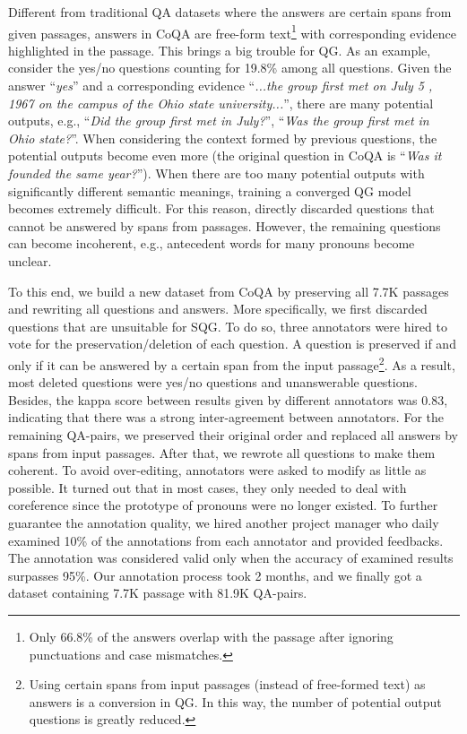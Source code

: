 \documentclass[11pt,a4paper]{article}
\begin{document}
Different from traditional QA datasets where the answers are certain spans from given passages, answers in CoQA are free-form text\footnote{Only 66.8\% of the answers overlap with the passage after ignoring punctuations and case mismatches.} with corresponding evidence highlighted in the passage. This brings a big trouble for QG. 
As an example, consider the yes/no questions counting for 19.8\% among all questions. Given the answer ``\textit{yes}'' and a corresponding evidence ``\textit{...the group first met on July 5 , 1967 on the campus of the Ohio state university...}'', there are many potential outputs, e.g., ``\textit{Did the group first met in July?}'', ``\textit{Was the group first met in Ohio state?}''. When considering the context formed by previous questions, the potential outputs become even more (the original question in CoQA is ``\textit{Was it founded the same year?}''). 
When there are too many potential outputs with significantly different semantic meanings, training a converged QG model becomes extremely difficult. 
For this reason, \citet{gao2019interconnected} directly discarded questions that cannot be answered by spans from passages. However, the remaining questions can become incoherent, e.g., antecedent words for many pronouns become unclear. 

To this end, we build a new dataset from CoQA by preserving all 7.7K passages and rewriting all questions and answers. More specifically, we first discarded questions that are unsuitable for SQG. To do so, three annotators were hired to vote for the preservation/deletion of each question. A question is preserved if and only if it can be answered by a certain span from the input passage\footnote{Using certain spans from input passages (instead of free-formed text) as answers is a conversion in QG. In this way, the number of potential output questions is greatly reduced.}. As a result, most deleted questions were yes/no questions and unanswerable questions. Besides, the kappa score between results given by different annotators was 0.83, indicating that there was a strong inter-agreement between annotators. 
For the remaining QA-pairs, we preserved their original order and replaced all answers by spans from input passages. After that, we rewrote all questions to make them coherent. To avoid over-editing, annotators were asked to modify as little as possible. It turned out that in most cases, they only needed to deal with coreference since the prototype of pronouns were no longer existed. To further guarantee the annotation quality, we hired another project manager who daily examined 10\% of the annotations from each annotator and provided feedbacks. The annotation was considered valid only when the accuracy of examined results surpasses 95\%. 
Our annotation process took 2 months, and we finally got a dataset containing 7.7K passage with 81.9K QA-pairs.
\end{document}
